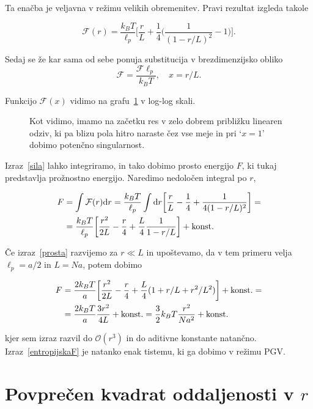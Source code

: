 \documentclass[12pt, a4 paper]{article}
\renewcommand{\d}{
	\ensuremath{\mathrm{d}}
}
\newcommand{\F}{
	\ensuremath{\mathcal{F}}
}
\begin{document}
Ta ena\v cba je veljavna v re\v zimu velikih obremenitev. Pravi rezultat izgleda takole

\begin{equation}
	\F(r) = \frac{k_B T}{\ell_p}\bigg[\frac{r}{L} + \frac{1}{4}\bigg(\frac{1}{(1 - r/L)^2} - 1\bigg)\bigg].
	\label{sila}
\end{equation}

Sedaj se \v ze kar sama od sebe ponuja substitucija v brezdimenzijsko obliko
\[
	\mathscr{F} = \frac{\F\ell_p}{k_B T}, \quad x = r/L.
\]

Funkcijo $\mathscr{F}(x)$ vidimo na grafu~\ref{fig1} v log-log skali.

\begin{figure}[H]\centering
	
	\caption{Kot vidimo, imamo na za\v cetku res v zelo dobrem pribli\v zku linearen odziv,
		ki pa blizu pola hitro naraste \v cez vse meje in pri `$x = 1$' dobimo poten\v cno
		singularnost.}
	\label{fig1}
\end{figure}

Izraz~\eqref{sila} lahko integriramo, in tako dobimo prosto energijo $F$, ki tukaj predstavlja pro\v znostno
energijo. Naredimo nedolo\v cen integral po $r$,

\begin{align}
	F &= \int\F(r)\d r = \frac{k_B T}{\ell_p}\int\d r\bigg[\frac{r}{L} - \frac{1}{4} +
		\frac{1}{4(1 - r/L)^2}\bigg] = \notag \\
	&= \frac{k_B T}{\ell_p}\bigg[\frac{r^2}{2L} - \frac{r}{4} + \frac{L}{4}\frac{1}{1 - r/L}\bigg]
		+ \text{konst.}
	\label{prosta}
\end{align}

\v Ce izraz~\eqref{prosta} razvijemo za $r \ll L$ in upo\v stevamo, da v tem primeru velja $\ell_p = a/2$
in $L = Na$, potem dobimo

\begin{align}
	F &= \frac{2k_B T}{a}\bigg[\frac{r^2}{2L} - \frac{r}{4} + \frac{L}{4}(1 + r/L + r^2/L^2)\bigg]
		+ \text{konst.} = \notag \\
	&= \frac{2k_BT}{a} \frac{3r^2}{4L} + \text{konst.} = \frac{3}{2}k_B T \frac{r^2}{Na^2} + \text{konst.}
	\label{entropijskaF}
\end{align}

kjer sem izraz razvil do $\mathcal{O}(r^3)$ in do aditivne konstante natan\v cno. Izraz~\eqref{entropijskaF} je
natanko enak tistemu, ki ga dobimo v re\v zimu PGV.

\section{Povpre\v cen kvadrat oddaljenosti v $r$}
\end{document}
